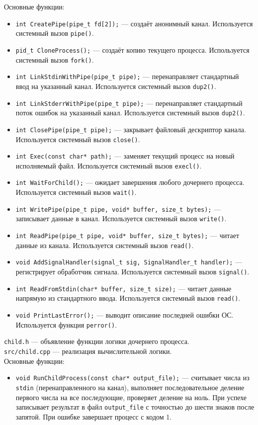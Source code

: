 Основные функции:
\begin{itemize} 
    \item \texttt{int CreatePipe(pipe\_t fd[2]);} --- создаёт анонимный канал. Используется системный вызов \texttt{pipe()}.
    \item \texttt{pid\_t CloneProcess();} --- создаёт копию текущего процесса. Используется системный вызов \texttt{fork()}.
    \item \texttt{int LinkStdinWithPipe(pipe\_t pipe);} --- перенаправляет стандартный ввод на указанный канал. Используется системный вызов \texttt{dup2()}.
    \item \texttt{int LinkStderrWithPipe(pipe\_t pipe);} --- перенаправляет стандартный поток ошибок на указанный канал. Используется системный вызов \texttt{dup2()}.
    \item \texttt{int ClosePipe(pipe\_t pipe);} --- закрывает файловый дескриптор канала. Используется системный вызов \texttt{close()}.
    \item \texttt{int Exec(const char* path);} --- заменяет текущий процесс на новый исполняемый файл. Используется системный вызов \texttt{execl()}.
    \item \texttt{int WaitForChild();} --- ожидает завершения любого дочернего процесса. Используется системный вызов \texttt{wait()}.
    \item \texttt{int WritePipe(pipe\_t pipe, void* buffer, size\_t bytes);} --- записывает данные в канал. Используется системный вызов \texttt{write()}.
    \item \texttt{int ReadPipe(pipe\_t pipe, void* buffer, size\_t bytes);} --- читает данные из канала. Используется системный вызов \texttt{read()}.
    \item \texttt{void AddSignalHandler(signal\_t sig, SignalHandler\_t handler);} --- регистрирует обработчик сигнала. Используется системный вызов \texttt{signal()}.
    \item \texttt{int ReadFromStdin(char* buffer, size\_t size);} --- читает данные напрямую из стандартного ввода. Используется системный вызов \texttt{read()}.
    \item \texttt{void PrintLastError();} --- выводит описание последней ошибки ОС. Используется функция \texttt{perror()}.
\end{itemize}

\vspace{1\baselineskip}

\texttt{child.h} --- объявление функции логики дочернего процесса. \\
\texttt{src/child.cpp} --- реализация вычислительной логики. \\
Основные функции:
\begin{itemize}
    \item \texttt{void RunChildProcess(const char* output\_file);} --- считывает числа из \texttt{stdin} (перенаправленного на канал), выполняет последовательное деление первого числа на все последующие, проверяет деление на ноль. При успехе записывает результат в файл \texttt{output\_file} с точностью до шести знаков после запятой. При ошибке завершает процесс с кодом 1.
\end{itemize}

